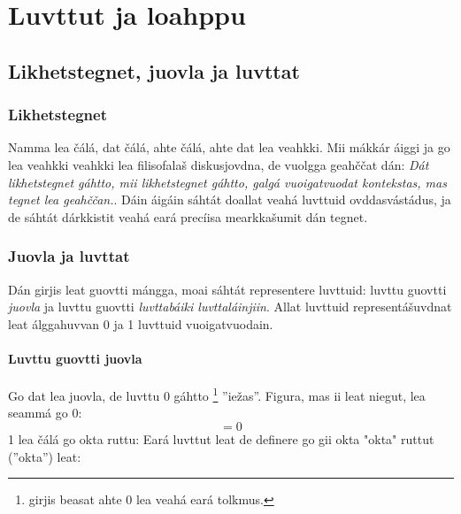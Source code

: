 





	
	\chapter{Luvttut ja loahppu}
	\newpage
	\section{Likhetstegnet, juovla ja luvttat}
	
	\subsection*{Likhetstegnet}
	Namma lea čálá, dat čálá, ahte  
	\sym{$ = $}
	čálá, ahte dat lea veahkki. Mii mákkár áiggi ja go lea veahkki veahkki lea filisofalaš diskusjovdna, de vuolgga geahččat dán: \textsl{Dát likhetstegnet
		\sym{$ = $}
		gáhtto, mii likhetstegnet gáhtto, galgá vuoigatvuodat kontekstas, mas tegnet lea geahččan.}. Dáin áigáin sáhtát doallat veahá luvttuid ovddasvástádus, ja de sáhtát dárkkistit veahá eará precíisa mearkkašumit dán tegnet.
	
	\regv

	
	\subsection*{Juovla ja luvttat}
	Dán girjis leat guovtti mángga, moai sáhtát representere luvttuid: luvttu guovtti \textsl{juovla} ja luvttu guovtti \textsl{luvttabáiki luvttaláinjiin}. Allat luvttuid representášuvdnat leat álggahuvvan 0 ja 1 luvttuid vuoigatvuodain.
	
	\newpage
	\subsubsection*{Luvttu guovtti juovla}
	Go dat lea juovla, de luvttu 0 gáhtto
	\footnote{ girjis beasat ahte 0 lea veahá eará tolkmus.}
	''iežas''. Figura, mas ii leat niegut, lea seammá go 0:
	\[ =0 \]
	1 lea čálá go okta ruttu:
	Eará luvttut leat de definere go gii okta "okta" ruttut (''okta'') leat:
	\vs
	
